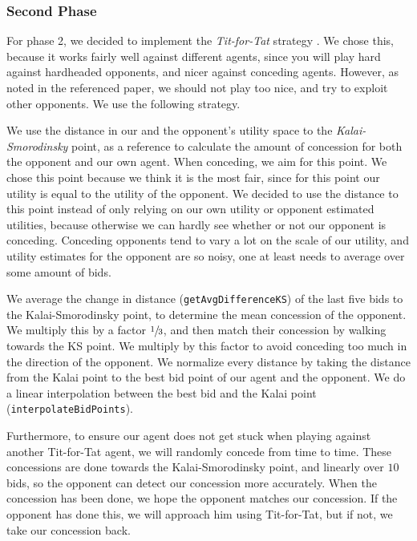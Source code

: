 \subsubsection{Second Phase}

For phase 2, we decided to implement the \emph{Tit-for-Tat} strategy \cite{titfortat}.
We chose this, because it works fairly well against different agents, since you will play
hard against hardheaded opponents, and nicer against conceding agents.
However, as noted in the referenced paper, we should not play too nice,
and try to exploit other opponents. We use the following strategy.

We use the distance in our and the opponent's utility space to the \emph{Kalai-Smorodinsky} point, as a reference to calculate
the amount of concession for both the opponent and our own agent. When conceding, we aim for this point. We chose this point because we think it is the most fair, since for this point our utility is equal to the utility of the opponent. We decided to use the distance to this point instead of only relying on our own utility or opponent estimated utilities, because otherwise we can hardly see whether or not our opponent is conceding. Conceding opponents tend to vary a lot on the scale of our utility,
and utility estimates for the opponent are so noisy, one at least needs to average over some amount of bids. 

We average the change in distance (\verb-getAvgDifferenceKS-) of the last five bids to the Kalai-Smorodinsky point, to determine the mean concession of the opponent. We multiply this by a factor $\sfrac{1}{3}$, and then match their concession by walking towards the KS point. We multiply by this factor to avoid conceding too much in the direction of the opponent. 
We normalize every distance by taking the distance from the Kalai point to the best bid point of our agent and the opponent. We do a linear interpolation between the best bid and the Kalai point (\verb-interpolateBidPoints-).

Furthermore, to ensure our agent does not get stuck when playing against another Tit-for-Tat agent, we will randomly concede from time to time. These concessions are done towards the Kalai-Smorodinsky point, and linearly over $10$ bids, so the opponent can detect our concession more accurately. When the concession has been done, we hope the opponent matches  our concession. If the opponent has done this, we will approach him using Tit-for-Tat, but if not, we take our concession back. 

